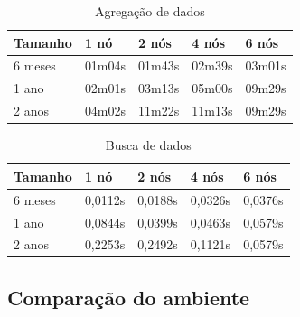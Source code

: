 \begin{table}[]
	\centering
	\caption{Agregação de dados}
	\label{tab:select_agreg}
	\begin{tabular}{lllll}
		\textbf{Tamanho} & \textbf{1 nó} & \textbf{2 nós} & \textbf{4 nós} & \textbf{6 nós} \\ \hline
		6 meses          & 01m04s        & 01m43s         & 02m39s         & 03m01s         \\ \hline
		1 ano            & 02m01s        & 03m13s         & 05m00s         & 09m29s         \\ \hline
		2 anos           & 04m02s        & 11m22s         & 11m13s         & 09m29s         \\ \hline
	\end{tabular}
\end{table}

\begin{table}[]
	\centering
	\caption{Busca de dados}
	\label{tab:select_busca}
	\begin{tabular}{lllll}
		\textbf{Tamanho} & \textbf{1 nó} & \textbf{2 nós} & \textbf{4 nós} & \textbf{6 nós} \\ \hline
		6 meses          & 0,0112s       & 0,0188s        & 0,0326s        & 0,0376s        \\ \hline
		1 ano            & 0,0844s       & 0,0399s        & 0,0463s        & 0,0579s        \\ \hline
		2 anos           & 0,2253s       & 0,2492s        & 0,1121s        & 0,0579s        \\ \hline
	\end{tabular}
\end{table}

\subsection{Comparação do ambiente}